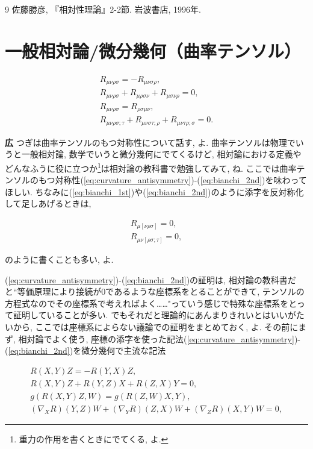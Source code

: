 \documentclass{ltjsarticle}
\theoremstyle{definition}
\newcommand{\parno}{\par\noindent}
\begin{document}
\begin{thebibliography}{9}
\bibitem{} 佐藤勝彦, 『相対性理論』2-2節. 岩波書店, 1996年.
\end{thebibliography}


\section{一般相対論/微分幾何（曲率テンソル）\label{section:curvature_tensor}}
\begin{tcolorbox}
\begin{gather}
R_{\mu\nu\rho\sigma}=-R_{\mu\nu\sigma\rho},\label{eq:curvature_antisymmetry}\\
R_{\mu\nu\rho\sigma}+R_{\mu\rho\sigma\nu}+R_{\mu\sigma\nu\rho}=0,\label{eq:bianchi_1st}\\
R_{\mu\nu\rho\sigma}=R_{\rho\sigma\mu\nu},\\
R_{\mu\nu\rho\sigma;\tau}+R_{\mu\nu\sigma\tau;\rho}+R_{\mu\nu\tau\rho;\sigma}=0.\label{eq:bianchi_2nd}
\end{gather}
\end{tcolorbox}
\parno
\textbf{広} つぎは曲率テンソルのもつ対称性について話す, よ. 曲率テンソルは物理でいうと一般相対論, 数学でいうと微分幾何にでてくるけど, 相対論における定義やどんなふうに役に立つか\footnote{重力の作用を書くときにでてくる, よ.}は相対論の教科書で勉強してみて, ね. ここでは曲率テンソルのもつ対称性(\ref{eq:curvature_antisymmetry})-(\ref{eq:bianchi_2nd})を味わってほしい. ちなみに(\ref{eq:bianchi_1st})や(\ref{eq:bianchi_2nd})のように添字を反対称化して足しあげるときは,
\begin{tcolorbox}
\begin{gather}
R_{\mu[\nu\rho\sigma]}=0,\label{eq:bianchi_1st_antisymmetrised}\\
R_{\mu\nu[\rho\sigma;\tau]}=0,
\end{gather}
\end{tcolorbox}
\parno
のように書くことも多い, よ.\par
(\ref{eq:curvature_antisymmetry})-(\ref{eq:bianchi_2nd})の証明は, 相対論の教科書だと``等価原理により接続が0であるような座標系をとることができて, テンソルの方程式なのでその座標系で考えればよく……"っていう感じで特殊な座標系をとって証明していることが多い. でもそれだと理論的にあんまりきれいとはいいがたいから, ここでは座標系によらない議論での証明をまとめておく, よ. その前にまず, 相対論でよく使う, 座標の添字を使った記法(\ref{eq:curvature_antisymmetry})-(\ref{eq:bianchi_2nd})を微分幾何で主流な記法
\begin{tcolorbox}
\begin{gather}
R(X,Y)Z=-R(Y,X)Z,\label{eq:curvature_antisymmetry_vector_field}\\
R(X,Y)Z+R(Y,Z)X+R(Z,X)Y=0,\label{eq:bianchi_1st_vector_field}\\
g(R(X,Y)Z,W)=g(R(Z,W)X,Y),\label{eq:curvature_symmetry_2to2}\\
(\nabla_XR)(Y,Z)W+(\nabla_YR)(Z,X)W+(\nabla_ZR)(X,Y)W=0,\label{eq:bianchi_2nd_vector_field}
\end{gather}
\end{tcolorbox}
\end{document}
